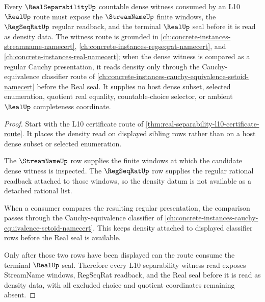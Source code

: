 \begin{theorem}
\label{thm:real-separability-streamname-witness-route}
Every $\RealSeparabilityUp$ countable dense witness consumed by an L10 $\RealUp$ route must expose the $\StreamNameUp$ finite windows, the $\RegSeqRatUp$ regular readback, and the terminal $\RealUp$ seal before it is read as density data. The witness route is grounded in \autoref{ch:concrete-instances-streamname-namecert}, \autoref{ch:concrete-instances-regseqrat-namecert}, and \autoref{ch:concrete-instances-real-namecert}; when the dense witness is compared as a regular Cauchy presentation, it reads density only through the Cauchy-equivalence classifier route of \autoref{ch:concrete-instances-cauchy-equivalence-setoid-namecert} before the Real seal. It supplies no host dense subset, selected enumeration, quotient real equality, countable-choice selector, or ambient $\RealUp$ completeness coordinate.
\end{theorem}
\begin{proof}
Start with the L10 certificate route of \autoref{thm:real-separability-l10-certificate-route}. It places the density read on displayed sibling rows rather than on a host dense subset or selected enumeration.

The $\StreamNameUp$ row supplies the finite windows at which the candidate dense witness is inspected. The $\RegSeqRatUp$ row supplies the regular rational readback attached to those windows, so the density datum is not available as a detached rational list.

When a consumer compares the resulting regular presentation, the comparison passes through the Cauchy-equivalence classifier of \autoref{ch:concrete-instances-cauchy-equivalence-setoid-namecert}. This keeps density attached to displayed classifier rows before the Real seal is available.

Only after those two rows have been displayed can the route consume the terminal $\RealUp$ seal. Therefore every L10 separability witness read exposes StreamName windows, RegSeqRat readback, and the Real seal before it is read as density data, with all excluded choice and quotient coordinates remaining absent.
\end{proof}
